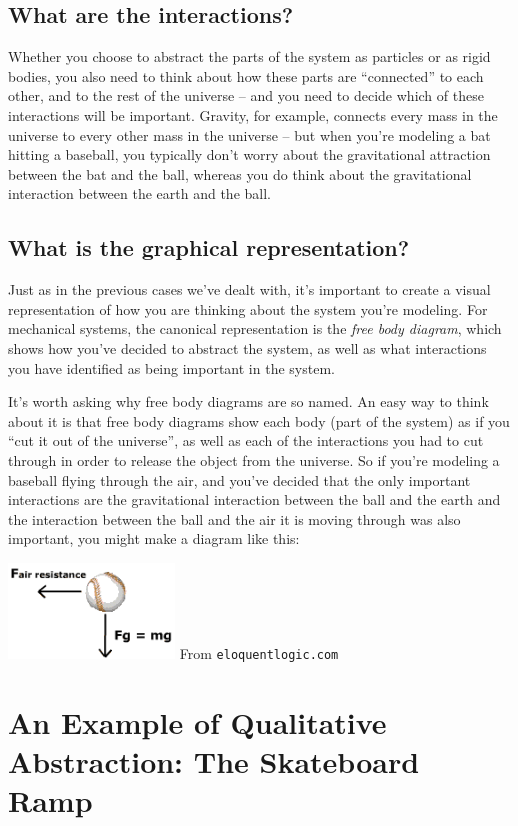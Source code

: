 \subsection{What are the interactions?}
Whether you choose to abstract the parts of the system as particles or as rigid bodies, you also need to think about how these parts are ``connected'' to each other, and to the rest of the universe -- and you need to decide which of these interactions will be important.  Gravity, for example, connects every mass in the universe to every other mass in the universe -- but when you're modeling a bat hitting a baseball, you typically don't worry about the gravitational attraction between the bat and the ball, whereas you do think about the gravitational interaction between the earth and the ball. 

\subsection{What is the graphical representation?}

Just as in the previous cases we've dealt with, it's important to create a visual representation of how you are thinking about the system you're modeling.  For mechanical systems, the canonical representation is the {\it free body diagram}, which shows how you've decided to abstract the system, as well as what interactions you have identified as being important in the system.  

It's worth asking why free body diagrams are so named.  An easy way to think about it is that free body diagrams show each body (part of the system) as if you ``cut it out of the universe'', as well as each of the interactions you had to cut through in order to release the object from the universe.  So if you're modeling a baseball flying through the air, and you've decided that the only important interactions are the gravitational interaction between the ball and the earth and the interaction between the ball and the air it is moving through was also important, you might make a diagram like this:


\centerline{\includegraphics[height=1in]{figs/baseballfbd}
From {\tt eloquentlogic.com}}


\section{An Example of Qualitative Abstraction: The Skateboard Ramp}

